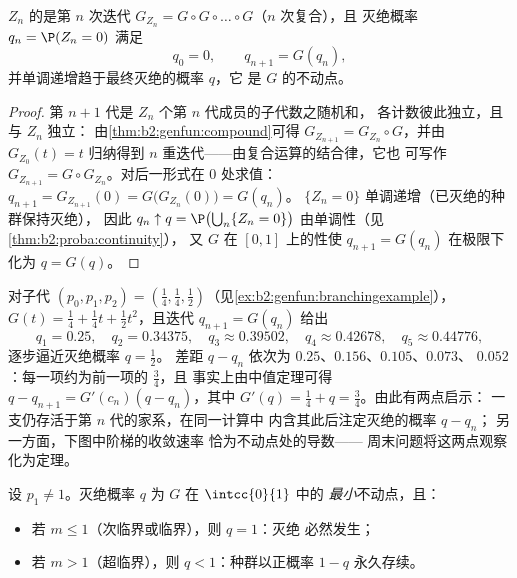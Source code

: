 \begin{proposition}\label{prop:b2:genfun:branching}
$Z_n$ 的是第 $n$ 次迭代
$G_{Z_n} = G \circ G \circ \dots \circ G$（$n$ 次复合），且
灭绝概率 $q_n = \P(Z_n = 0)$ 满足
\[
q_0 = 0, \qquad q_{n+1} = G(q_n),
\]
并单调递增趋于最终灭绝的概率 $q$，它
是 $G$ 的不动点。
\end{proposition}

\begin{proof}
第 $n + 1$ 代是 $Z_n$ 个第 $n$ 代成员的子代数之随机和，
各计数彼此独立，且与 $Z_n$ 独立：
由\cref{thm:b2:genfun:compound}可得 $G_{Z_{n+1}} =
G_{Z_n} \circ G$，并由 $G_{Z_0}(t) = t$ 归纳得到
$n$ 重迭代——由复合运算的结合律，它也
可写作 $G_{Z_{n+1}} = G \circ G_{Z_n}$。对后一形式在
$0$ 处求值：$q_{n+1} = G_{Z_{n+1}}(0) =
G\bigl(G_{Z_n}(0)\bigr) = G(q_n)$。 $\{Z_n = 0\}$ 单调递增（已灭绝的种群保持灭绝），
因此 $q_n \uparrow q = \P\bigl(\bigcup_n\{Z_n = 0\}\bigr)$
由单调性（见\cref{thm:b2:proba:continuity}），
又 $G$ 在 $[0, 1]$ 上的性使 $q_{n+1} = G(q_n)$ 在极限下化为 $q =
G(q)$。
\end{proof}

\begin{example}[观察灭绝概率的收敛]
\label{ex:b2:genfun:cobwebnumerics}
对子代 $(p_0, p_1, p_2) = (\tfrac14,
\tfrac14, \tfrac12)$（见\cref{ex:b2:genfun:branchingexample}），
$G(t) = \tfrac14 + \tfrac14t + \tfrac12t^2$，且迭代
$q_{n+1} = G(q_n)$ 给出
\[
q_1 = 0.25, \quad q_2 = 0.34375, \quad q_3 \approx 0.39502,
\quad q_4 \approx 0.42678, \quad q_5 \approx 0.44776,
\]
逐步逼近灭绝概率 $q = \tfrac12$。
差距 $q - q_n$ 依次为 $0.25$、$0.156$、$0.105$、$0.073$、
$0.052$：每一项约为前一项的 $\tfrac34$，且
事实上由中值定理可得 $q - q_{n+1} = G'(c_n)(q
- q_n)$，其中 $G'(q) = \tfrac14 + q = \tfrac34$。由此有两点启示：
一支仍存活于第 $n$ 代的家系，在同一计算中
内含其此后注定灭绝的概率 $q - q_n$；
另一方面，下图中阶梯的收敛速率
恰为不动点处的导数——
周末问题将这两点观察化为定理。
\end{example}

\begin{theorem}[灭绝判别准则]\label{thm:b2:genfun:extinction}
设 $p_1 \neq 1$。灭绝概率 $q$ 为 $G$ 在 $\intcc{0}{1}$ 中的
\emph{最小}不动点，且：
\begin{itemize}
\item 若 $m \leq 1$（次临界或临界），则 $q = 1$：灭绝
必然发生；
\item 若 $m > 1$（超临界），则 $q < 1$：种群以正概率
$1 - q$ 永久存续。
\end{itemize}
\end{theorem}

